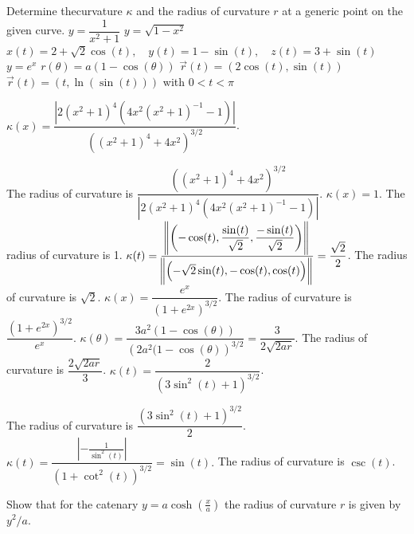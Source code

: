 \begin{Exercise} Determine thecurvature $\kappa$ and the radius of curvature $r$ at a generic point on the given curve.
     	\Question[difficulty=1] $y = \dfrac{1}{x^2+1}$ 
     	\Question[difficulty=1] $y = \sqrt{1-x^2}$ 
        \Question[difficulty=2] $x(t) = 2 + \sqrt{2} \cos(t),\quad  y(t) = 1 - \sin (t), \quad z(t) = 3 + \sin (t)$ 
        \Question[difficulty=1] $y=e^x$ 
        \Question[difficulty=2] $r(\theta) = a(1- \cos(\theta))$ 
        \Question[difficulty=1] $\vec r(t) = \left(2 \cos(t), \sin(t) \right)$  
        \Question[difficulty=1] $\vec r(t) = \left(t, \ln(\sin(t)) \right)$ \qquad with \quad $0<t<\pi$  
\end{Exercise}

\begin{Answer}
    
     	\Question 
     	$\kappa(x) = \dfrac{ \left| 2(x^2+1)^4\left(4x^2(x^2+1)^{-1}-1 \right)\right|}{\left((x^2+1)^4+4x^2 \right)^{3/2}}$. 
      
      The radius of curvature is $\dfrac{\left((x^2+1)^4+4x^2 \right)^{3/2}}{\left| 2(x^2+1)^4\left(4x^2(x^2+1)^{-1}-1 \right)\right|}$.
     	\Question 
        $\kappa(x) = 1$. The radius of curvature is 1.
         \Question 
         $\kappa(t) = \dfrac{\norm{\left( -\cos (t), \dfrac{ \sin (t)}{\sqrt{2}}, \dfrac{-\sin (t)}{\sqrt{2}} \right)}}{\norm{\left(-\sqrt{2} \sin (t), - \cos (t), \cos (t)\right)}} = \dfrac{\sqrt{2}}{2}$. The radius of curvature is $\sqrt{2}$.
         \Question 
         $\kappa (x) = \dfrac{e^x}{(1+e^{2x})^{3/2}}.$ The radius of curvature is $\dfrac{(1+e^{2x})^{3/2}}{e^x}$.
         \Question 
         $\kappa (\theta) = \dfrac{3a^2 (1- \cos (\theta))}{\left(2a^2 (1 - \cos (\theta)  \right)^{3/2}} = \dfrac{3}{2 \sqrt{2ar}}$. The radius of curvature is $\dfrac{2 \sqrt{2ar}}{3}$.
         \Question 
         $\kappa (t) = \dfrac{2}{\left(3 \sin^2 (t) +1 \right)^{3/2}}$. 
         
        The radius of curvature is $\dfrac{\left(3 \sin^2 (t) +1 \right)^{3/2}}{2}$.
         \Question 
         $\kappa (t) = \dfrac{\left|-\frac{1}{\sin^2(t)}\right|}{(1+\cot^{2}(t))^{3/2}} = \sin(t).$ The radius of curvature is $\csc(t)$.
     
\end{Answer}

\ifanalysis 
\begin{Exercise}[difficulty=2] Show that for the catenary $y = a \cosh\left( \frac{x}{a} \right)$ the radius of curvature $r$ is given by $y^2/a$.
\end{Exercise}

